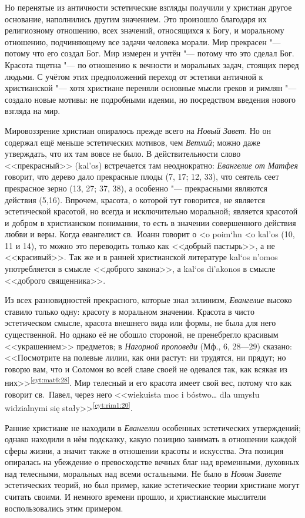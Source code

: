 Но перенятые из античности эстетические взгляды получили у христиан другое основание, наполнились другим значением. Это произошло благодаря их религиозному отношению, всех значений, относящихся к Богу, и моральному отношению, подчиняющему все задачи человека морали. Мир прекрасен "--- потому что его создал Бог. Мир измерен и учтён "--- потому что это сделал Бог. Красота тщетна "--- по отношению к вечности и моральных задач, стоящих перед людьми. С учётом этих предположений переход от эстетики античной к христианской "--- хотя христиане переняли основные мысли греков и римлян "--- создало новые мотивы: не подробными идеями, но посредством введения нового взгляда на мир.

Мировоззрение христиан опиралось прежде всего на \emph{Новый Завет}. Но он содержал ещё меньше эстетических мотивов, чем \emph{Ветхий}; можно даже утверждать, что их там вовсе не было. В действительности слово <<прекрасный>> (\textgreek{kal'os}) встречается там неоднократно: \emph{Евангелие от Матфея} говорит, что дерево дало прекрасные плоды (7, 17; 12, 33), что сеятель сеет прекрасное зерно (13, 27; 37, 38), а особенно "--- прекрасными являются действия (5,16). Впрочем, красота, о которой тут говорится, не является эстетической красотой, но всегда и исключительно моральной; является красотой и добром в христианском понимании, то есть в значении совершенного действия любви и веры. Когда евангелист св.~Иоанн говорит о \textgreek{<o poim`hn <o kal'os} (10, 11 и 14), то можно это переводить только как <<добрый пастырь>>, а не <<красивый>>. Так же и в ранней христианской литературе \textgreek{kal`os n'omos} употребляется в смысле <<доброго закона>>, а  \textgreek{kal`os di'akonos} в смысле <<доброго священника>>.

Из всех разновидностей прекрасного, которые знал эллинизм, \emph{Евангелие} высоко ставило только одну: красоту в моральном значении. Красота в чисто эстетическом смысле, красота внешнего вида или формы, не была для него существенной. Но однако её не обошло стороной, не пренебрегло красивым <<украшением>> предметов; в \emph{Нагорной проповеди}  (Мф., 6, 28—29) сказано: <<Посмотрите на полевые лилии, как они растут: ни трудятся, ни прядут; но говорю вам, что и Соломон во всей славе своей не одевался так, как всякая из них>>\textsuperscript{\ref{cyt:mat6:28}}. Мир телесный и его красота имеет свой вес, потому что как говорит св.~Павел, через него <<wiekuista moc i bóstwo… dla umysłu widzialnymi się stały>>\textsuperscript{\ref{cyt:rim1:20}}.

Ранние христиане не находили в \emph{Евангелии} особенных эстетических утверждений; однако находили в нём подсказку, какую позицию занимать в отношении каждой сферы жизни, а значит также в отношении красоты и искусства. Эта позиция опиралась на убеждение о превосходстве вечных благ над временными, духовных над телесными, моральных над всеми остальными. Не было в \emph{Новом Завете} эстетических теорий, но был пример, какие эстетические теории христиане могут считать своими. И немного времени прошло, и христианские мыслители воспользовались этим примером.
